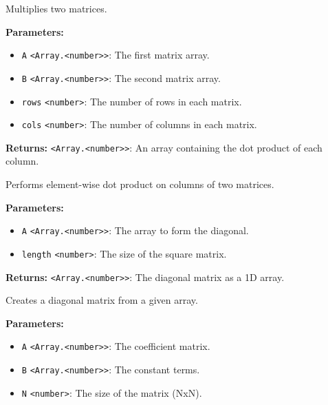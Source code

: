 \documentclass[12pt,a4paper]{article}
\begin{document}
\noindent Multiplies two matrices.

\vspace{5mm}
\noindent {}


\noindent \textbf{Parameters:}
\begin{itemize}
  \item \texttt{A} \texttt{<Array.<number>>}: The first matrix array.
  \item \texttt{B} \texttt{<Array.<number>>}: The second matrix array.
  \item \texttt{rows} \texttt{<number>}: The number of rows in each matrix.
  \item \texttt{cols} \texttt{<number>}: The number of columns in each matrix.
\end{itemize}

\noindent \textbf{Returns:} \texttt{<Array.<number>>}: An array containing the dot product of each column.

\noindent Performs element-wise dot product on columns of two matrices.

\vspace{5mm}
\noindent {}


\noindent \textbf{Parameters:}
\begin{itemize}
  \item \texttt{A} \texttt{<Array.<number>>}: The array to form the diagonal.
  \item \texttt{length} \texttt{<number>}: The size of the square matrix.
\end{itemize}

\noindent \textbf{Returns:} \texttt{<Array.<number>>}: The diagonal matrix as a 1D array.

\noindent Creates a diagonal matrix from a given array.

\vspace{5mm}
\noindent {}


\noindent \textbf{Parameters:}
\begin{itemize}
  \item \texttt{A} \texttt{<Array.<number>>}: The coefficient matrix.
  \item \texttt{B} \texttt{<Array.<number>>}: The constant terms.
  \item \texttt{N} \texttt{<number>}: The size of the matrix (NxN).
\end{itemize}
\end{document}
